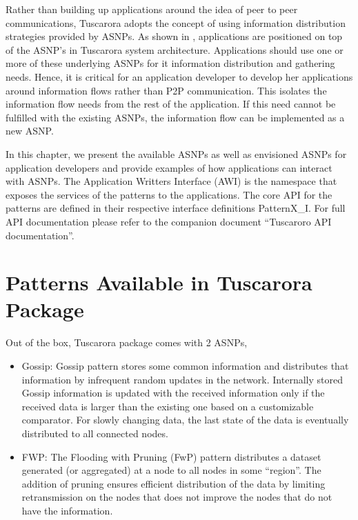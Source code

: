 
Rather than building up applications around the idea of peer to peer communications, Tuscarora adopts the concept of using information distribution strategies provided by ASNPs. 
As shown in , applications are positioned on top of the ASNP's in Tuscarora system architecture. 
Applications should use one or more of these underlying ASNPs for it information distribution and gathering needs. 
Hence, it is critical for an application developer to develop her applications around information flows rather than P2P communication. 
This isolates the information flow needs from the rest of the application. 
If this need cannot be fulfilled with the existing ASNPs, the information flow can be implemented as a new ASNP. 



In this chapter, we present the available ASNPs as well as envisioned ASNPs for application developers and provide examples of how applications can interact with ASNPs. 
The Application Writters Interface (AWI) is the namespace that exposes the
services of the patterns to the applications. 
The core API for the patterns are defined in their respective interface definitions
PatternX\_I. 
For full API documentation please refer to the companion document ``Tuscaroro API documentation''.

\section{Patterns Available in Tuscarora Package}
 
Out of the box, Tuscarora package comes with 2 ASNPs,
\begin{itemize}
\item Gossip: Gossip pattern stores some common information and distributes that information by infrequent random updates in the network. Internally stored Gossip information is updated with the received information only if the received data is larger than the existing one based on a customizable comparator. For slowly changing data, the last state of the data is eventually distributed to all connected nodes.

\item FWP: The Flooding with Pruning (FwP) pattern distributes a dataset generated (or aggregated) at a
node to all nodes in some “region”. The addition of pruning ensures efficient distribution of the data by limiting retransmission on the nodes that does not improve the nodes that do not have the information.

\end{itemize}


